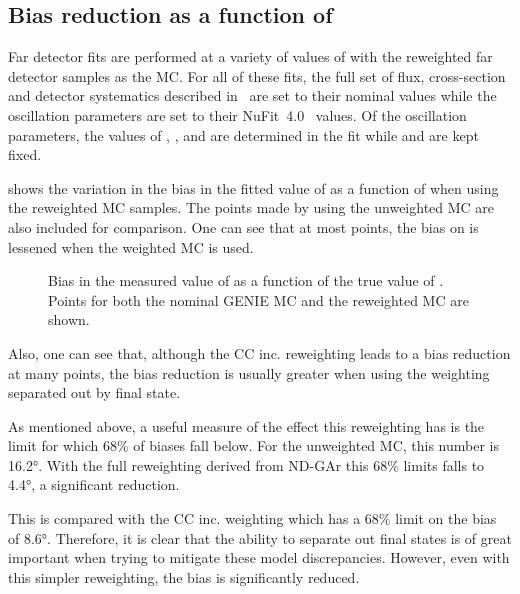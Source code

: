 \subsection{Bias reduction as a function of \dcp}
\label{sec:dune_ndrwt:rwt:biasReduction}

Far detector fits are performed at a variety of values of \dcp with the reweighted far detector samples as the MC.
For all of these fits, the full set of flux, cross-section and detector systematics described in~\cite{Abi:2020qib} are set to their nominal values while the oscillation parameters are set to their NuFit~4.0~\cite{nufit4} values.
Of the oscillation parameters, the values of , ,  and \dcp are determined in the fit while  and  are kept fixed.

 shows the variation in the bias in the fitted value of \dcp as a function of \dcpTrue when using the reweighted MC samples.
The points made by using the unweighted MC are also included for comparison.
One can see that at most points, the bias on \dcp is lessened when the weighted MC is used.

\begin{figure}[h]
	\begin{adjustbox}{max totalsize=.75\linewidth, center}
		
	\end{adjustbox}
	\caption[Bias in fit value of \dcp with ND-GAr reweighted MC.]{Bias in the measured value of \dcp as a function of the true value of \dcp. Points for both the nominal GENIE MC and the reweighted MC are shown.}
	\label{fig:dcpBiasWithWgt}
\end{figure}

Also, one can see that, although the CC inc. reweighting leads to a bias reduction at many points, the bias reduction is usually greater when using the weighting separated out by final state.

As mentioned above, a useful measure of the effect this reweighting has is the limit for which 68\% of biases fall below.
For the unweighted MC, this number is \ang{16.2}. 
With the full reweighting derived from ND-GAr this 68\% limits falls to \ang{4.4}, a significant reduction.

This is compared with the CC inc. weighting which has a 68\% limit on the \dcp bias of \ang{8.6}.
Therefore, it is clear that the ability to separate out final states is of great important when trying to mitigate these model discrepancies.
However, even with this simpler reweighting, the bias is significantly reduced.

